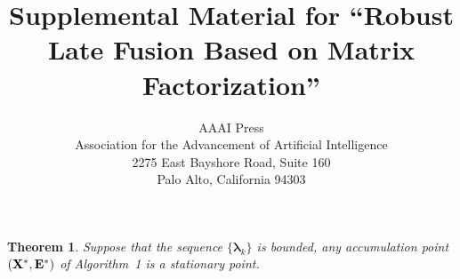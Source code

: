 \documentclass[letterpaper]{article}
\newtheorem{theorem}{Theorem}
\def\bE{{\bf E}}
\def\blambda{{\bm \lambda}}
\def\bX{{\bf X}}
\def\bX{{\bf X}}
\begin{document}
%



\title{Supplemental Material for ``Robust Late Fusion Based on Matrix Factorization''}

\author{AAAI Press\\
Association for the Advancement of Artificial Intelligence\\
2275 East Bayshore Road, Suite 160\\
Palo Alto, California 94303\\
}



\maketitle





\begin{theorem}\label{theorem:alm_convergence}
  Suppose that the sequence $\{ \blambda_{k} \}$ is bounded, any accumulation point $(\bX^*, \bE^*)$ of Algorithm~1 is a stationary point.
\end{theorem}
\end{document}
